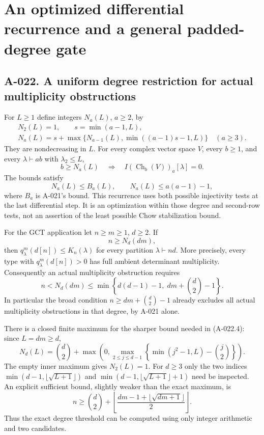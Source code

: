 \section{An optimized differential recurrence and a general padded-degree gate}

\subsection*{A-022. A uniform degree restriction for actual multiplicity obstructions}
For $L\geq1$ define integers $N_a(L)$, $a\geq2$, by
\[
 \begin{gathered}
 N_2(L)=1,\qquad s=\min(a-1,L),\\
 N_a(L)=s+\max\{N_{a-1}(L),\min((a-1)s-1,L)\}
                       \quad(a\geq3).
 \end{gathered}                                      \tag{A-022.1}
\]
They are nondecreasing in $L$. For every complex vector space
$V$, every $b\geq1$, and every $\lambda\vdash ab$ with
$\lambda_2\leq L$,
\[
 b\geq N_a(L)
 \quad\Longrightarrow\quad
 I(\operatorname{Ch}_b(V))_a[\lambda]=0.                \tag{A-022.2}
\]
The bounds satisfy
\[
 N_a(L)\leq B_a(L),\qquad
 N_a(L)\leq a(a-1)-1,                                 \tag{A-022.3}
\]
where $B_a$ is A-021's bound. This recurrence uses both
possible injectivity tests at the last differential step. It
is an optimization within those degree and second-row tests,
not an assertion of the least possible Chow stabilization bound.

For the GCT application let $n\geq m\geq1$, $d\geq2$.
If
\[
                              n\geq N_d(dm),           \tag{A-022.4}
\]
then $q^m_\lambda(d[n])\leq K_n(\lambda)$ for every partition
$\lambda\vdash nd$. More precisely, every type with
$q^m_\lambda(d[n])>0$ has full ambient determinant multiplicity.
Consequently an actual multiplicity obstruction requires
\[
 n<N_d(dm)\leq
 \min\left\{d(d-1)-1,\;dm+\binom d2-1\right\}.        \tag{A-022.5}
\]
In particular the broad condition
$n\geq dm+\binom d2-1$ already excludes all actual
multiplicity obstructions in that degree, by A-021 alone.

There is a closed finite maximum for the sharper bound needed
in (A-022.4): since $L=dm\geq d$,
\[
 \boxed{\quad N_d(L)=\binom d2+
 \max\left(0,\max_{2\leq j\leq d-1}
      \left\{\min(j^2-1,L)-\binom j2\right\}\right).\quad}
                                                               \tag{A-022.6}
\]
The empty inner maximum gives $N_2(L)=1$. For $d\geq3$
only the two indices
$\min(d-1,\lfloor\sqrt{L+1}\rfloor)$ and
$\min(d-1,\lfloor\sqrt{L+1}\rfloor+1)$ need be inspected.
An explicit sufficient bound, slightly weaker than the exact
maximum, is
\[
 n\geq \binom d2+
 \left\lfloor\frac{dm-1+\lfloor\sqrt{dm+1}\rfloor}{2}
                                                    \right\rfloor.
                                                               \tag{A-022.7}
\]
Thus the exact degree threshold can be computed using only
integer arithmetic and two candidates.


